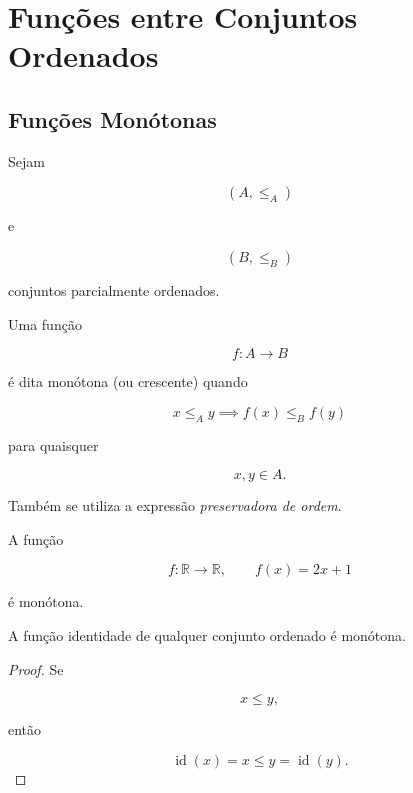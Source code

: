 \documentclass[../../main]{subfiles}
\begin{document}
\section{Funções entre Conjuntos Ordenados}
\label{sec:matematica:funcoes:conjuntos-ordenados}

\subsection{Funções Monótonas}

\begin{defn}
	\label{def:matematica:funcoes:ordem:monotona}

	Sejam

	\[
		(A,\le_A)
	\]

	e

	\[
		(B,\le_B)
	\]

	conjuntos parcialmente ordenados.

	Uma função

	\[
		f:A\to B
	\]

	é dita monótona (ou crescente) quando

	\[
		x\le_A y
		\implies
		f(x)\le_B f(y)
	\]

	para quaisquer

	\[
		x,y\in A.
	\]

\end{defn}

\begin{obs}

	Também se utiliza a expressão
	\emph{preservadora de ordem}.

\end{obs}

\begin{ex}

	A função

	\[
		f:\mathbb R\to\mathbb R,
		\qquad
		f(x)=2x+1
	\]

	é monótona.

\end{ex}

\begin{prop}
	\label{prop:matematica:funcoes:ordem:identidade}

	A função identidade de qualquer conjunto ordenado é monótona.

\end{prop}

\begin{proof}

	Se

	\[
		x\le y,
	\]

	então

	\[
		\operatorname{id}(x)
		=
		x
		\le
		y
		=
		\operatorname{id}(y).
	\]

\end{proof}
\end{document}
